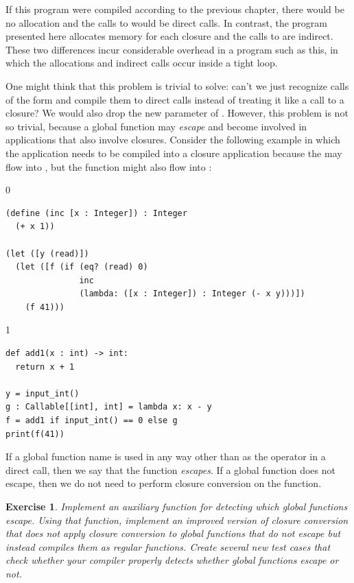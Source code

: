 \documentclass[7x10]{TimesAPriori_MIT}%
\def\racketEd{0}
\def\pythonEd{1}
\def\edition{1}
\newcommand{\pythonColor}[0]{}
\newtheorem{exercise}[theorem]{Exercise}
\numberwithin{theorem}{chapter}
\numberwithin{definition}{chapter}
\numberwithin{equation}{chapter}
\begin{document}
If this program were compiled according to the previous chapter, there
would be no allocation and the calls to  would be
direct calls. In contrast, the program presented here allocates memory
for each closure and the calls to  are indirect. These
two differences incur considerable overhead in a program such as this,
in which the allocations and indirect calls occur inside a tight loop.

One might think that this problem is trivial to solve: can't we just
recognize calls of the form 
and compile them to direct calls instead of treating it like a call to
a closure? We would also drop the new  parameter of
.
%
However, this problem is not so trivial, because a global function may
\emph{escape} and become involved in applications that also involve
closures. Consider the following example in which the application
 needs to be compiled into a closure
application because the  may flow into , but the
 function might also flow into :
\begin{center}
\begin{minipage}{\textwidth}
{\if\edition\racketEd  
\begin{lstlisting}
(define (inc [x : Integer]) : Integer
  (+ x 1))

(let ([y (read)])
  (let ([f (if (eq? (read) 0)
               inc
               (lambda: ([x : Integer]) : Integer (- x y)))])
    (f 41)))
\end{lstlisting}
\fi}
{\if\edition\pythonEd\pythonColor  
\begin{lstlisting}
def add1(x : int) -> int:
  return x + 1

y = input_int()
g : Callable[[int], int] = lambda x: x - y
f = add1 if input_int() == 0 else g
print(f(41))
\end{lstlisting}
\fi}
\end{minipage}
\end{center}
If a global function name is used in any way other than as the
operator in a direct call, then we say that the function
\emph{escapes}. If a global function does not escape, then we do not
need to perform closure conversion on the function.

\begin{exercise}\normalfont\normalsize
  Implement an auxiliary function for detecting which global
  functions escape. Using that function, implement an improved version
  of closure conversion that does not apply closure conversion to
  global functions that do not escape but instead compiles them as
  regular functions. Create several new test cases that check whether
  your compiler properly detects whether global functions escape or not.
\end{exercise}
\end{document}
